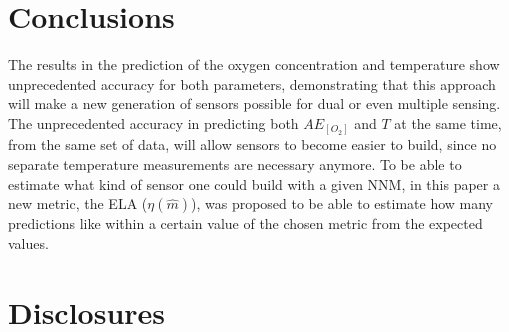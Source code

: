 \documentclass[9pt,twocolumn,twoside,pdftex]{optica}
\begin{document}
%
%
%


%
%
%
%




\section{Conclusions}

The results in the prediction of the oxygen concentration and temperature show unprecedented accuracy for both parameters, demonstrating that this approach will make a new generation of sensors possible for dual or even multiple sensing. The unprecedented accuracy in predicting both $AE_{[O_2]}$ and $T$ at the same time, from the same set of data, will allow sensors to become easier to build, since no separate temperature measurements are necessary anymore. To be able to estimate what kind of sensor one could build with a given NNM, in this paper a new metric, the ELA ($\eta(\hat m)$), was proposed to be able to estimate how many predictions like within a certain value of the chosen metric from the expected values.





\section*{Disclosures}
\end{document}
